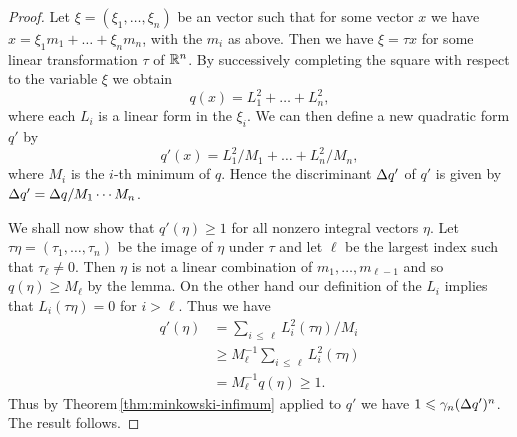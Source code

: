 \begin{proof}
    Let \(\xi = (\xi_1, \dots, \xi_n)\) be an vector such that for some vector \(x\) we have \(x = \xi_1 m_1 + \dots + \xi_n m_n\), with the \(m_i\) as above. Then we have \(\xi = \tau x\) for some linear transformation \(\tau\) of \(\mathbb{R}^n\). By successively completing the square with respect to the variable \(\xi\) we obtain
    \[
        q(x) = L_1^2 + \dots + L_n^2,
    \]
    where each \(L_i\) is a linear form in the \(\xi_i\). We can then define a new quadratic form \(q'\) by
    \[
        q'(x) = L_1^2/M_1 + \dots + L_n^2/M_n,
    \]
    where \(M_i\) is the \(i\)-th minimum of \(q\). Hence the discriminant \({\Delta} q'\) of \(q'\) is given by \({\Delta} q' = {\Delta} q/M_1 \cdots M_n\).

    We shall now show that \(q'(\eta) \geq 1\) for all nonzero integral vectors \(\eta\). Let \(\tau\eta = (\tau_1, \dots, \tau_n)\) be the image of \(\eta\) under \(\tau\) and let \(\ell\) be the largest index such that \(\tau_\ell \neq 0\). Then \(\eta\) is not a linear combination of \(m_1, \dots, m_{\ell-1}\) and so \(q(\eta) \geq M_\ell\) by the lemma. On the other hand our definition of the \(L_i\) implies that \(L_i(\tau\eta) = 0\) for \(i > \ell\). Thus we have
    \begin{align*}
        q'(\eta) &= \sum_{i\,\leq\,\ell} L^2_i(\tau\eta)/M_i \\ &\geq M_\ell^{-1} \sum_{i\,\leq\,\ell} L^2_i(\tau\eta)\\ &= M_\ell^{-1} q(\eta) \geq 1.
    \end{align*}
    Thus by Theorem\,\ref{thm:minkowski-infimum} applied to \(q'\) we have \(1 \leqslant \gamma_n ({\Delta} q')^n\). The result follows.
\end{proof}
